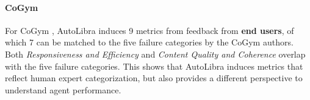 \paragraph{CoGym}
For CoGym \citep{shao2024collaborative}, AutoLibra induces 9 metrics from feedback from \textbf{end users}, of which 7 can be matched to the five failure categories by the CoGym authors. Both \textit{Responsiveness and Efficiency} and \textit{Content Quality and Coherence} overlap with the five failure categories. This shows that AutoLibra induces metrics that reflect human expert categorization, but also provides a different perspective to understand agent performance.


